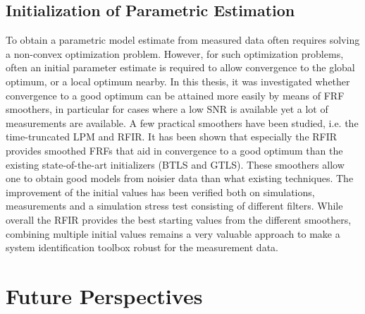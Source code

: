   \subsection{Initialization of Parametric Estimation}
  To obtain a parametric model estimate from measured data often requires solving a non-convex optimization problem.
  However, for such optimization problems, often an initial parameter estimate is required to allow convergence to the global optimum, or a local optimum nearby.
  In this thesis, it was investigated whether convergence to a good optimum can be attained more easily by means of \gls{FRF} smoothers, in particular for cases where a low \gls{SNR} is available yet a lot of measurements are available.
  A few practical smoothers have been studied, i.e. the time-truncated \gls{LPM} and \gls{RFIR}.
  It has been shown that especially the \gls{RFIR} provides smoothed \glspl{FRF} that aid in convergence to a good optimum than the existing state-of-the-art initializers (\gls{BTLS} and \gls{GTLS}).
  These smoothers allow one to obtain good models from noisier data than what existing techniques.
  The improvement of the initial values has been verified both on simulations, measurements and a simulation stress test consisting of different filters.
  While overall the \gls{RFIR} provides the best starting values from the different smoothers, combining multiple initial values remains a very valuable approach to make a system identification toolbox robust for the measurement data.

\section{Future Perspectives}
